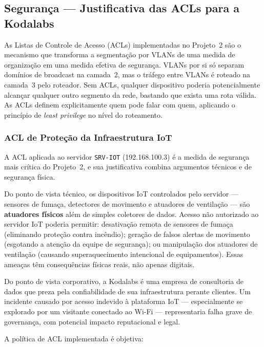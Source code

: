 \subsection{Segurança — Justificativa das ACLs para a Kodalabs}

As Listas de Controle de Acesso (ACLs) implementadas no Projeto~2 são o mecanismo
que transforma a segmentação por VLANs de uma medida de organização em uma medida
efetiva de segurança. VLANs por si só separam domínios de broadcast na camada~2,
mas o tráfego entre VLANs é roteado na camada~3 pelo roteador. Sem ACLs, qualquer
dispositivo poderia potencialmente alcançar qualquer outro segmento da rede,
bastando que exista uma rota válida. As ACLs definem explicitamente quem pode falar
com quem, aplicando o princípio de \textit{least privilege} no nível do roteamento.

\subsubsection{ACL de Proteção da Infraestrutura IoT}

A ACL aplicada ao servidor \texttt{SRV-IOT} (192.168.100.3) é a medida de
segurança mais crítica do Projeto~2, e sua justificativa combina argumentos
técnicos e de segurança física.

Do ponto de vista técnico, os dispositivos IoT controlados pelo servidor — sensores
de fumaça, detectores de movimento e atuadores de ventilação — são
\textbf{atuadores físicos} além de simples coletores de dados. Acesso não
autorizado ao servidor IoT poderia permitir: desativação remota de sensores de
fumaça (eliminando proteção contra incêndio); geração de falsos alertas de movimento
(esgotando a atenção da equipe de segurança); ou manipulação dos atuadores de
ventilação (causando superaquecimento intencional de equipamentos). Essas ameaças
têm consequências físicas reais, não apenas digitais.

Do ponto de vista corporativo, a Kodalabs é uma empresa de consultoria de dados
que preza pela confiabilidade de sua infraestrutura perante clientes. Um incidente
causado por acesso indevido à plataforma IoT — especialmente se explorado por um
visitante conectado ao Wi-Fi — representaria falha grave de governança, com
potencial impacto reputacional e legal.

A política de ACL implementada é objetiva:

